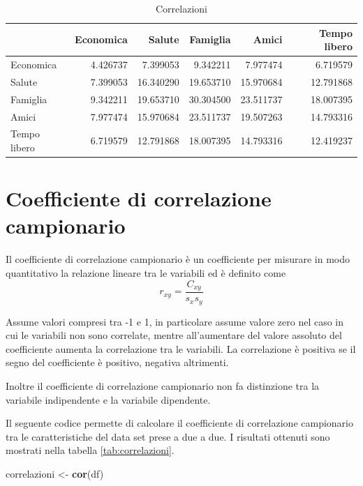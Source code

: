 \documentclass[]{book}
\newenvironment{Shaded}{\begin{snugshade}}{\end{snugshade}}
\newcommand{\KeywordTok}[1]{\textcolor[rgb]{0.13,0.29,0.53}{\textbf{#1}}}
\newcommand{\StringTok}[1]{\textcolor[rgb]{0.31,0.60,0.02}{#1}}
\newcommand{\NormalTok}[1]{#1}
\begin{document}
\begin{table}

\caption{\label{tab:covarianze}Correlazioni}
\centering
\begin{tabular}[t]{l|r|r|r|r|r}
\hline
  & Economica & Salute & Famiglia & Amici & Tempo libero\\
\hline
Economica & 4.426737 & 7.399053 & 9.342211 & 7.977474 & 6.719579\\
\hline
Salute & 7.399053 & 16.340290 & 19.653710 & 15.970684 & 12.791868\\
\hline
Famiglia & 9.342211 & 19.653710 & 30.304500 & 23.511737 & 18.007395\\
\hline
Amici & 7.977474 & 15.970684 & 23.511737 & 19.507263 & 14.793316\\
\hline
Tempo libero & 6.719579 & 12.791868 & 18.007395 & 14.793316 & 12.419237\\
\hline
\end{tabular}
\end{table}

\section{Coefficiente di correlazione
campionario}\label{coefficiente-di-correlazione-campionario}

Il coefficiente di correlazione campionario è un coefficiente per
misurare in modo quantitativo la relazione lineare tra le variabili ed è
definito come \[r_{xy}=\frac{C_{xy}}{s_x s_y}\]

Assume valori compresi tra -1 e 1, in particolare assume valore zero nel
caso in cui le variabili non sono correlate, mentre all'aumentare del
valore assoluto del coefficiente aumenta la correlazione tra le
variabili. La correlazione è positiva se il segno del coefficiente è
positivo, negativa altrimenti.

Inoltre il coefficiente di correlazione campionario non fa distinzione
tra la variabile indipendente e la variabile dipendente.

Il seguente codice permette di calcolare il coefficiente di correlazione
campionario tra le caratteristiche del data set prese a due a due. I
risultati ottenuti sono mostrati nella tabella \ref{tab:correlazioni}.

\begin{Shaded}
\begin{Highlighting}[]
\NormalTok{correlazioni <-}\StringTok{ }\KeywordTok{cor}\NormalTok{(df)}
\end{Highlighting}
\end{Shaded}
\end{document}

